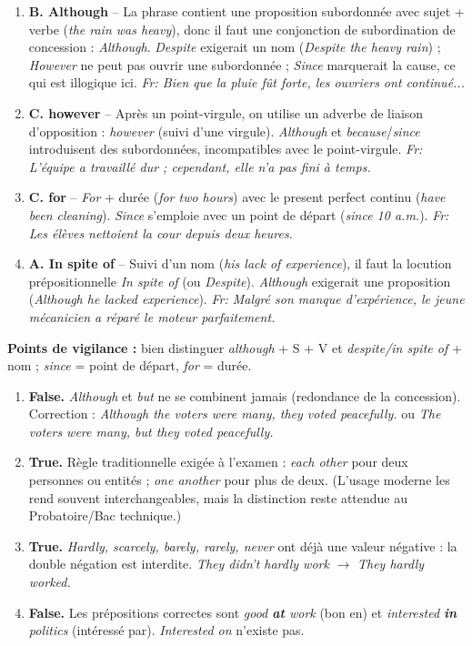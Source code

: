 \documentclass[11pt]{article}
\begin{document}
\begin{corrige}
\begin{enumerate}
\item \textbf{B. Although} -- La phrase contient une proposition subordonnée avec sujet + verbe (\emph{the rain was heavy}), donc il faut une conjonction de subordination de concession : \emph{Although}. \emph{Despite} exigerait un nom (\emph{Despite the heavy rain}) ; \emph{However} ne peut pas ouvrir une subordonnée ; \emph{Since} marquerait la cause, ce qui est illogique ici. \emph{Fr: Bien que la pluie fût forte, les ouvriers ont continué...}
\item \textbf{C. however} -- Après un point-virgule, on utilise un adverbe de liaison d'opposition : \emph{however} (suivi d'une virgule). \emph{Although} et \emph{because}/\emph{since} introduisent des subordonnées, incompatibles avec le point-virgule. \emph{Fr: L'équipe a travaillé dur ; cependant, elle n'a pas fini à temps.}
\item \textbf{C. for} -- \emph{For} + durée (\emph{for two hours}) avec le present perfect continu (\emph{have been cleaning}). \emph{Since} s'emploie avec un point de départ (\emph{since 10 a.m.}). \emph{Fr: Les élèves nettoient la cour depuis deux heures.}
\item \textbf{A. In spite of} -- Suivi d'un nom (\emph{his lack of experience}), il faut la locution prépositionnelle \emph{In spite of} (ou \emph{Despite}). \emph{Although} exigerait une proposition (\emph{Although he lacked experience}). \emph{Fr: Malgré son manque d'expérience, le jeune mécanicien a réparé le moteur parfaitement.}
\end{enumerate}
\textbf{Points de vigilance :} bien distinguer \emph{although} + S + V et \emph{despite/in spite of} + nom ; \emph{since} = point de départ, \emph{for} = durée.
\end{corrige}

\begin{corrige}
\begin{enumerate}
\item \textbf{False.} \emph{Although} et \emph{but} ne se combinent jamais (redondance de la concession). Correction : \emph{Although the voters were many, they voted peacefully.} ou \emph{The voters were many, but they voted peacefully.}
\item \textbf{True.} Règle traditionnelle exigée à l'examen : \emph{each other} pour deux personnes ou entités ; \emph{one another} pour plus de deux. (L'usage moderne les rend souvent interchangeables, mais la distinction reste attendue au Probatoire/Bac technique.)
\item \textbf{True.} \emph{Hardly, scarcely, barely, rarely, never} ont déjà une valeur négative : la double négation est interdite. \emph{They didn't hardly work} $\rightarrow$ \emph{They hardly worked.}
\item \textbf{False.} Les prépositions correctes sont \emph{good \textbf{at} work} (bon en) et \emph{interested \textbf{in} politics} (intéressé par). \emph{Interested on} n'existe pas.
\end{enumerate}
\end{corrige}
\end{document}

